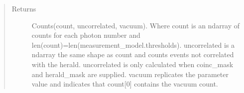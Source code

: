 \documentclass[letterpaper,10pt,english]{sphinxmanual}
\begin{document}
\begin{fulllineitems}
\begin{quote}
\begin{description}
\item[{Returns}] \leavevmode
\sphinxAtStartPar
Counts(count, uncorrelated, vacuum). Where count is an ndarray of
counts for each photon number
and len(count)=len(measurement\_model.thresholds). uncorrelated is a
ndarray the same shape as count and counts
events not correlated with the herald. uncorrelated is only
calculated when coinc\_mask and herald\_mask are supplied.
vacuum replicates the parameter value and indicates that count{[}0{]}
contains the vacuum count.

\end{description}\end{quote}

\end{fulllineitems}


\begin{fulllineitems}
\label{\detokenize{tes:tes.analysis.displaced_thermal}}
\end{fulllineitems}


\begin{fulllineitems}
\label{\detokenize{tes:tes.analysis.displaced_vacuum}}
\end{fulllineitems}

\end{document}
